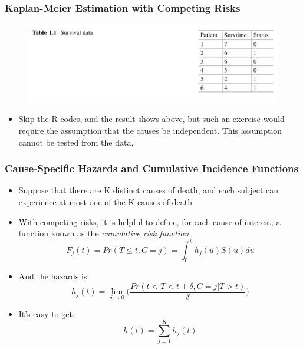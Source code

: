 \documentclass{beamer}
\newcommand{\empr}[1]{{\emph{\color{red}#1}}}
\begin{document}
\pagebreak
\begin{frame}
\frametitle{Kaplan-Meier Estimation with Competing Risks}
\begin{figure}[h!]
\includegraphics[scale = .5]{001.png}
\end{figure}
\begin{itemize}
\item Skip the R codes, and the result shows above, but such an exercise would require the assumption that the causes be independent. This assumption cannot be tested from the data,
\end{itemize}
\end{frame}

\pagebreak
\begin{frame}
\frametitle{Cause-Specific Hazards and Cumulative Incidence Functions}
\begin{itemize}
\item Suppose that there are K distinct causes of death, and each subject can experience at most one of the K causes of death
\item With competing risks, it is helpful to define, for each cause of interest, a function known as the \empr{cumulative risk function}
\begin{equation}
F_j(t) = Pr(T\le t, C=j) = \int_{0}^{t} h_j(u)S(u) du
\end{equation}
\item And the hazards is:
\begin{equation}
h_j(t) = \lim\limits_{\delta \to 0}\bigg( \frac{Pr(t<T<t+\delta,C=j|T>t)}{\delta}\bigg)
\end{equation}
\item It's easy to get:
\begin{equation}
h(t) = \sum\limits_{j=1}^{K}h_j(t)
\end{equation}
\end{itemize}
\end{frame}
\end{document}
